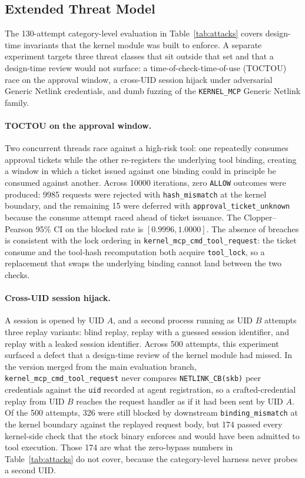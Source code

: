\subsection{Extended Threat Model}
\label{sec:extended-attacks}

The 130-attempt category-level evaluation in Table~\ref{tab:attacks} covers design-time invariants that the kernel module was built to enforce.
A separate experiment targets three threat classes that sit outside that set and that a design-time review would not surface: a time-of-check-time-of-use (TOCTOU) race on the approval window, a cross-UID session hijack under adversarial Generic Netlink credentials, and dumb fuzzing of the \texttt{KERNEL\_\allowbreak MCP} Generic Netlink family.

\paragraph{TOCTOU on the approval window.}
Two concurrent threads race against a high-risk tool: one repeatedly consumes approval tickets while the other re-registers the underlying tool binding, creating a window in which a ticket issued against one binding could in principle be consumed against another.
Across \num{10000} iterations, zero \texttt{ALLOW} outcomes were produced: \num{9985} requests were rejected with \texttt{hash\_\allowbreak mismatch} at the kernel boundary, and the remaining 15 were deferred with \texttt{approval\_\allowbreak ticket\_\allowbreak unknown} because the consume attempt raced ahead of ticket issuance.
The Clopper--Pearson 95\% CI on the blocked rate is $[0.9996, 1.0000]$.
The absence of breaches is consistent with the lock ordering in \texttt{kernel\_\allowbreak mcp\_\allowbreak cmd\_\allowbreak tool\_\allowbreak request}: the ticket consume and the tool-hash recomputation both acquire \texttt{tool\_lock}, so a replacement that swaps the underlying binding cannot land between the two checks.

\paragraph{Cross-UID session hijack.}
A session is opened by UID $A$, and a second process running as UID $B$ attempts three replay variants: blind replay, replay with a guessed session identifier, and replay with a leaked session identifier.
Across \num{500} attempts, this experiment surfaced a defect that a design-time review of the kernel module had missed.
In the version merged from the main evaluation branch, \texttt{kernel\_\allowbreak mcp\_\allowbreak cmd\_\allowbreak tool\_\allowbreak request} never compares \texttt{NETLINK\_\allowbreak CB(skb)} peer credentials against the \texttt{uid} recorded at agent registration, so a crafted-credential replay from UID $B$ reaches the request handler as if it had been sent by UID $A$.
Of the 500 attempts, 326 were still blocked by downstream \texttt{binding\_\allowbreak mismatch} at the kernel boundary against the replayed request body, but 174 passed every kernel-side check that the stock binary enforces and would have been admitted to tool execution.
Those 174 are what the zero-bypass numbers in Table~\ref{tab:attacks} do not cover, because the category-level harness never probes a second UID.

